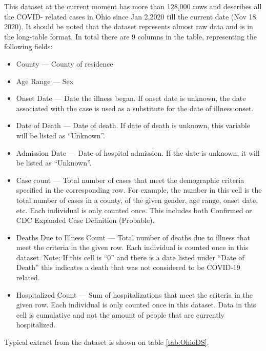 \documentclass[conference]{IEEEtran}
\begin{document}
	This dataset at the current moment has more
        than 128,000 rows and describes all the COVID- related cases in Ohio since Jan 2,2020 till the current date (Nov 18 2020). It should be noted that the dataset represents almost raw data and is in the long-table format. In total there are 9 columns in the table, representing the following fields:
        \begin{itemize}
        \item County --- County of residence
        \item Age Range --- Sex
        \item Onset Date --- Date the illness began. If onset date is unknown, the date associated with the case is used as a substitute for the date of illness onset.
        \item Date of Death --- Date of death. If date of death is unknown, this variable will be listed as “Unknown”.
        \item Admission Date --- Date of hospital admission. If the date is unknown, it will be listed as “Unknown”.
        \item Case count --- Total number of cases that meet the demographic criteria specified in the corresponding row. For example, the number in this cell is the total number of cases in a county, of the given gender, age range, onset date, etc. Each individual is only counted once. This includes both Confirmed or CDC Expanded Case Definition (Probable).
        \item Deaths Due to Illness Count --- Total number of deaths due to illness that meet the criteria in the given row. Each individual is counted once in this dataset. Note: If this cell is “0” and there is a date listed under “Date of Death” this indicates a death that was not considered to be COVID-19 related.
        \item Hospitalized Count --- Sum of hospitalizations that meet the criteria in the given row. Each individual is only counted once in this dataset. Data in this cell is cumulative and not the amount of people that are currently hospitalized.
        \end{itemize}
Typical extract from the dataset is shown on table \ref{tab:OhioDS}.
\end{document}
